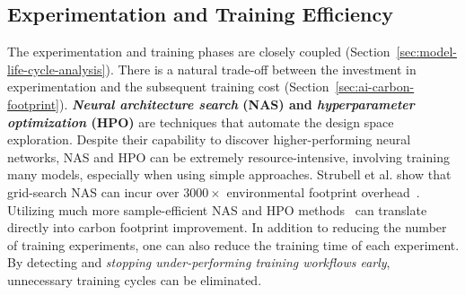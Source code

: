 \subsection{Experimentation and Training Efficiency}
\label{sec:experimentation-training}

The experimentation and training phases are closely coupled (Section~\ref{sec:model-life-cycle-analysis}).   
There is a natural trade-off between the investment in experimentation and the subsequent training cost (Section~\ref{sec:ai-carbon-footprint}).
\textbf{\emph{Neural architecture search} (NAS) and \emph{hyperparameter optimization} (HPO)} are techniques that automate the design space exploration. Despite their capability to discover higher-performing neural networks, NAS and HPO can be extremely resource-intensive, involving training many models, especially when using simple approaches. Strubell et al. show that grid-search NAS can incur over $3000\times$ environmental footprint overhead~\cite{Strubell:arxiv:2019}.
Utilizing much more sample-efficient NAS and HPO methods~\cite{Turner2021bbox,Ren2021NASsurvey} can translate directly into carbon footprint improvement.
In addition to reducing the number of training experiments, one can also reduce the training time of each experiment.
By detecting and \emph{stopping under-performing training workflows early}, unnecessary training cycles can be eliminated. 
    
